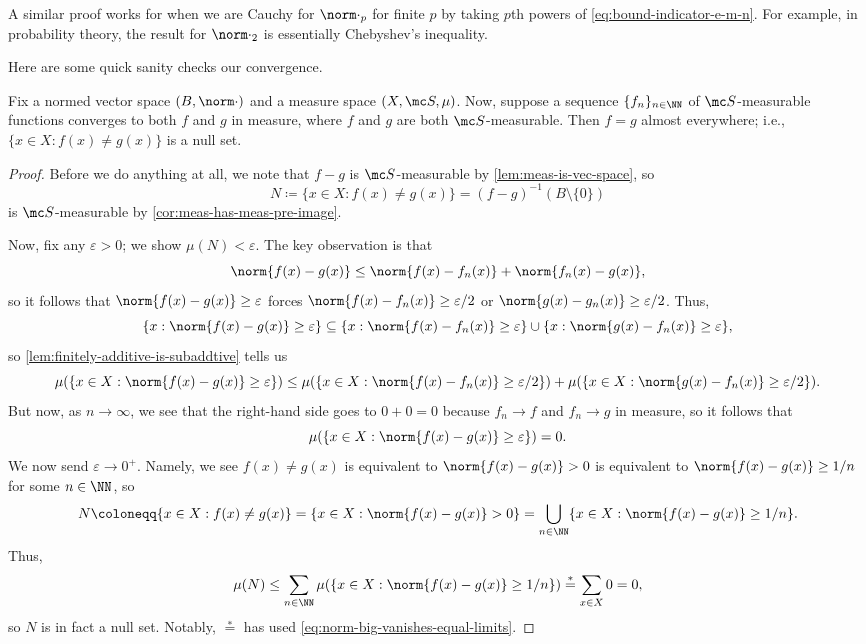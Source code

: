 \documentclass[../notes.tex]{subfiles}
\begin{document}
\begin{remark}
	A similar proof works for when we are Cauchy for $\norm\cdot_p$ for finite $p$ by taking $p$th powers of \autoref{eq:bound-indicator-e-m-n}. For example, in probability theory, the result for $\norm\cdot_2$ is essentially Chebyshev's inequality.
\end{remark}
Here are some quick sanity checks our convergence.
\begin{lemma} \label{lem:converge-in-measure-uniq-ae}
	Fix a normed vector space $(B,\norm\cdot)$ and a measure space $(X,\mc S,\mu)$. Now, suppose a sequence $\{f_n\}_{n\in\NN}$ of $\mc S$-measurable functions converges to both $f$ and $g$ in measure, where $f$ and $g$ are both $\mc S$-measurable. Then $f=g$ almost everywhere; i.e., $\{x\in X:f(x)\ne g(x)\}$ is a null set.
\end{lemma}
\begin{proof}
	Before we do anything at all, we note that $f-g$ is $\mc S$-measurable by \autoref{lem:meas-is-vec-space}, so
	\[N\coloneqq\{x\in X:f(x)\ne g(x)\}=(f-g)^{-1}(B\setminus\{0\})\]
	is $\mc S$-measurable by \autoref{cor:meas-has-meas-pre-image}.
	
	Now, fix any $\varepsilon>0$; we show $\mu(N)<\varepsilon$. The key observation is that
	\[\norm{f(x)-g(x)}\le\norm{f(x)-f_n(x)}+\norm{f_n(x)-g(x)},\]
	so it follows that $\norm{f(x)-g(x)}\ge\varepsilon$ forces $\norm{f(x)-f_n(x)}\ge\varepsilon/2$ or $\norm{g(x)-g_n(x)}\ge\varepsilon/2$. Thus,
	\[\{x:\norm{f(x)-g(x)}\ge\varepsilon\}\subseteq\{x:\norm{f(x)-f_n(x)}\ge\varepsilon\}\cup\{x:\norm{g(x)-f_n(x)}\ge\varepsilon\},\]
	so \autoref{lem:finitely-additive-is-subaddtive} tells us
	\[\mu(\{x\in X:\norm{f(x)-g(x)}\ge\varepsilon\})\le\mu(\{x\in X:\norm{f(x)-f_n(x)}\ge\varepsilon/2\})+\mu(\{x\in X:\norm{g(x)-f_n(x)}\ge\varepsilon/2\}).\]
	But now, as $n\to\infty$, we see that the right-hand side goes to $0+0=0$ because $f_n\to f$ and $f_n\to g$ in measure, so it follows that
	\begin{equation}
		\mu(\{x\in X:\norm{f(x)-g(x)}\ge\varepsilon\})=0. \label{eq:norm-big-vanishes-equal-limits}
	\end{equation}
	We now send $\varepsilon\to0^+$. Namely, we see $f(x)\ne g(x)$ is equivalent to $\norm{f(x)-g(x)}>0$ is equivalent to $\norm{f(x)-g(x)}\ge1/n$ for some $n\in\NN$, so
	\[N\coloneqq\{x\in X:f(x)\ne g(x)\}=\{x\in X:\norm{f(x)-g(x)}>0\}=\bigcup_{n\in\NN}\{x\in X:\norm{f(x)-g(x)}\ge1/n\}.\]
	Thus,
	\[\mu(N)\le\sum_{n\in\NN}\mu(\{x\in X:\norm{f(x)-g(x)}\ge1/n\})\stackrel*=\sum_{x\in X}0=0,\]
	so $N$ is in fact a null set. Notably, $\stackrel*=$ has used \autoref{eq:norm-big-vanishes-equal-limits}.
\end{proof}
\end{document}
